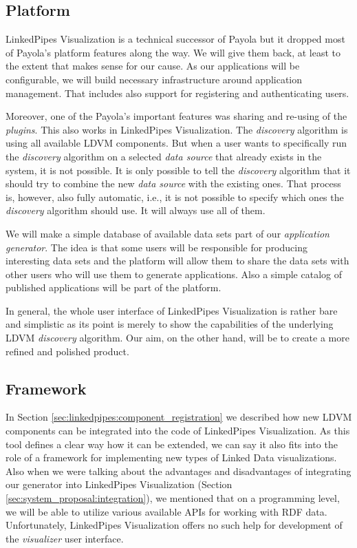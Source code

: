 \subsection{Platform}

LinkedPipes Visualization is a technical successor of Payola but it dropped most of Payola's platform features along the way. We will give them back, at least to the extent that makes sense for our cause. As our applications will be configurable, we will build necessary infrastructure around application management. That includes also support for registering and authenticating users.

Moreover, one of the Payola's important features was sharing and re-using of the \emph{plugins}. This also works in LinkedPipes Visualization. The \emph{discovery} algorithm is using all available LDVM components. But when a user wants to specifically run the \emph{discovery} algorithm on a selected \emph{data source} that already exists in the system, it is not possible. It is only possible to tell the \emph{discovery} algorithm that it should try to combine the new \emph{data source} with the existing ones. That process is, however, also fully automatic, i.e., it is not possible to specify which ones the \emph{discovery} algorithm should use. It will always use all of them.

We will make a simple database of available data sets part of our \emph{application generator}. The idea is that some users will be responsible for producing interesting data sets and the platform will allow them to share the data sets with other users who will use them to generate applications. Also a simple catalog of published applications will be part of the platform.

In general, the whole user interface of LinkedPipes Visualization is rather bare and simplistic as its point is merely to show the capabilities of the underlying LDVM \emph{discovery} algorithm. Our aim, on the other hand, will be to create a more refined and polished product.

\subsection{Framework}

In Section \ref{sec:linkedpipes:component_registration} we described how new LDVM components  can be integrated into the code of LinkedPipes Visualization. As this tool defines a clear way how it can be extended, we can say it also fits into the role of a framework for implementing new types of Linked Data visualizations. Also when we were talking about the advantages and disadvantages of integrating our generator into LinkedPipes Visualization (Section \ref{sec:system_proposal:integration}), we mentioned that on a programming level, we will be able to utilize various available APIs for working with RDF data. Unfortunately, LinkedPipes Visualization offers no such help for development of the \emph{visualizer} user interface.

